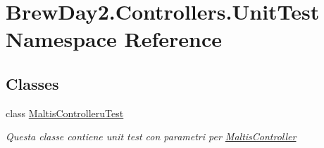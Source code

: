 \hypertarget{namespace_brew_day2_1_1_controllers_1_1_unit_test}{}\section{Brew\+Day2.\+Controllers.\+Unit\+Test Namespace Reference}
\label{namespace_brew_day2_1_1_controllers_1_1_unit_test}
\subsection*{Classes}
\begin{DoxyCompactItemize}
\item 
class \mbox{\hyperlink{class_brew_day2_1_1_controllers_1_1_unit_test_1_1_maltis_controlleru_test}{Maltis\+Controlleru\+Test}}
\begin{DoxyCompactList}\small\item\em Questa classe contiene unit test con parametri per \mbox{\hyperlink{class_brew_day2_1_1_controllers_1_1_maltis_controller}{Maltis\+Controller}}\end{DoxyCompactList}\end{DoxyCompactItemize}
